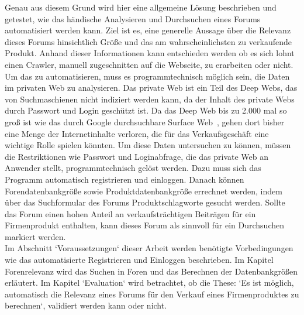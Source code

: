 Genau aus diesem Grund wird hier eine allgemeine Lösung beschrieben und getestet, wie das händische Analysieren und Durchsuchen eines Forums automatisiert werden kann. Ziel ist es, eine generelle Aussage über die Relevanz dieses Forums hinsichtlich Größe und das am wahrscheinlichsten zu verkaufende Produkt. Anhand dieser Informationen kann entschieden werden ob es sich lohnt einen Crawler, manuell zugeschnitten auf die Webseite, zu erarbeiten oder nicht.
Um das zu automatisieren, muss es programmtechnisch möglich sein, die Daten im privaten Web zu analysieren. Das private Web ist ein Teil des Deep Webs, das von Suchmaschienen nicht indiziert werden kann, da der Inhalt des private Webs durch Passwort und Login geschützt ist. Da das Deep Web bis zu 2.000 mal so groß ist wie das durch Google durchsuchbare Surface Web~\cite{gupta2014comparative}, gehen dort bisher eine Menge der Internetinhalte verloren, die für das Verkaufsgeschäft eine wichtige Rolle spielen könnten. Um diese Daten untersuchen zu können, müssen die Restriktionen wie Passwort und Loginabfrage, die das private Web an Anwender stellt, programmtechnisch gelöst werden. Dazu muss sich das Programm automatisch registrieren und einloggen. Danach können Forendatenbankgröße sowie Produktdatenbankgröße errechnet werden, indem über das Suchformular des Forums Produktschlagworte gesucht werden. Sollte das Forum einen hohen Anteil an verkaufsträchtigen Beiträgen für ein Firmenprodukt enthalten, kann dieses Forum als sinnvoll für ein Durchsuchen markiert werden.\\
Im Abschnitt `Voraussetzungen` dieser Arbeit werden benötigte Vorbedingungen wie das automatisierte Registrieren und Einloggen beschrieben. Im Kapitel Forenrelevanz wird das Suchen in Foren und das Berechnen der Datenbankgrößen erläutert. Im Kapitel `Evaluation` wird betrachtet, ob die These: `Es ist möglich, automatisch die Relevanz eines Forums für den Verkauf eines Firmenproduktes zu berechnen`, validiert werden kann oder nicht.
\newpage
